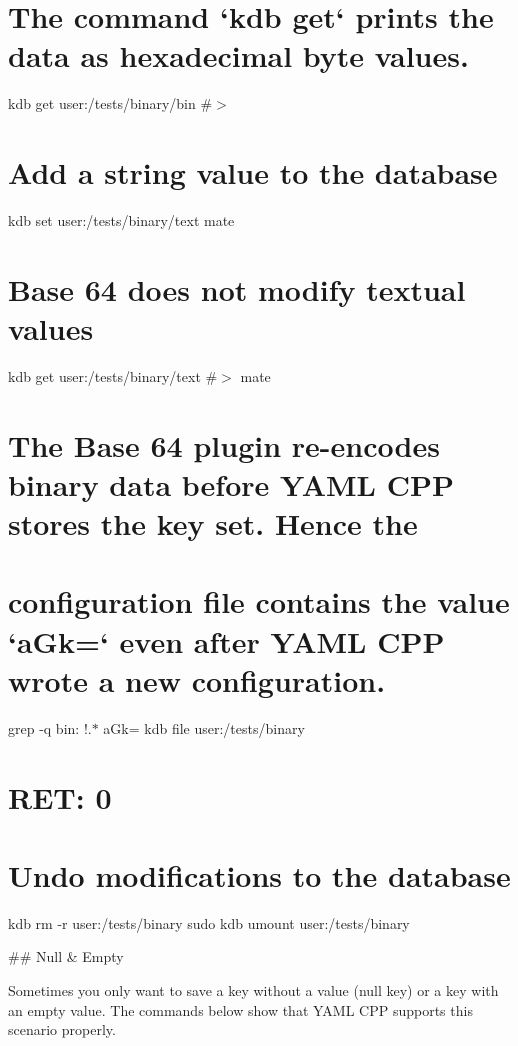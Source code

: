 \hypertarget{autotoc_md807_autotoc_md863}{}\section{The command `kdb get` prints the data as hexadecimal byte values.}\label{autotoc_md807_autotoc_md863}
kdb get user\+:/tests/binary/bin \#$>$ \hypertarget{autotoc_md807_autotoc_md864}{}\section{Add a string value to the database}\label{autotoc_md807_autotoc_md864}
kdb set user\+:/tests/binary/text mate \hypertarget{autotoc_md807_autotoc_md865}{}\section{Base 64 does not modify textual values}\label{autotoc_md807_autotoc_md865}
kdb get user\+:/tests/binary/text \#$>$ mate\hypertarget{autotoc_md807_autotoc_md866}{}\section{The Base 64 plugin re-\/encodes binary data before Y\+A\+M\+L C\+P\+P stores the key set. Hence the}\label{autotoc_md807_autotoc_md866}
\hypertarget{autotoc_md807_autotoc_md867}{}\section{configuration file contains the value `a\+Gk=` even after Y\+A\+M\+L C\+P\+P wrote a new configuration.}\label{autotoc_md807_autotoc_md867}
grep -\/q \textquotesingle{}bin\+: !.$\ast$ a\+Gk=\textquotesingle{} {\ttfamily kdb file user\+:/tests/binary} \hypertarget{autotoc_md807_autotoc_md868}{}\section{R\+E\+T\+: 0}\label{autotoc_md807_autotoc_md868}
\hypertarget{autotoc_md807_autotoc_md869}{}\section{Undo modifications to the database}\label{autotoc_md807_autotoc_md869}
kdb rm -\/r user\+:/tests/binary sudo kdb umount user\+:/tests/binary 
\begin{DoxyCode}
## Null & Empty

Sometimes you only want to save a key without a value (null key) or a key with an empty value. The commands
       below show that YAML CPP supports this scenario properly.
\end{DoxyCode}
